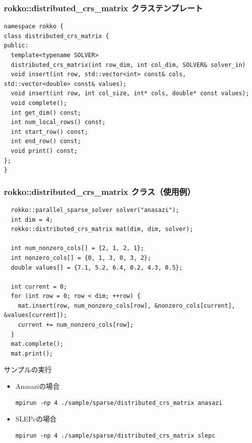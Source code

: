 \begin{frame}[c,fragile]
  \frametitle{rokko::distributed\_crs\_matrix クラステンプレート}
\begin{lstlisting}
namespace rokko {
class distributed_crs_matrix {
public:
  template<typename SOLVER>
  distributed_crs_matrix(int row_dim, int col_dim, SOLVER& solver_in)
  void insert(int row, std::vector<int> const& cols, std::vector<double> const& values);
  void insert(int row, int col_size, int* cols, double* const values);
  void complete();
  int get_dim() const;
  int num_local_rows() const;
  int start_row() const;
  int end_row() const;
  void print() const;
};
}
\end{lstlisting}
\end{frame}


\begin{frame}[c,fragile]
  \frametitle{rokko::distributed\_crs\_matrix クラス（使用例）
     }
\begin{lstlisting}
  rokko::parallel_sparse_solver solver("anasazi");
  int dim = 4;
  rokko::distributed_crs_matrix mat(dim, dim, solver);

  int num_nonzero_cols[] = {2, 1, 2, 1};
  int nonzero_cols[] = {0, 1, 3, 0, 3, 2};
  double values[] = {7.1, 5.2, 6.4, 0.2, 4.3, 0.5};

  int current = 0;
  for (int row = 0; row < dim; ++row) {
    mat.insert(row, num_nonzero_cols[row], &nonzero_cols[current], &values[current]);
    current += num_nonzero_cols[row]; 
  }
  mat.complete();
  mat.print();
\end{lstlisting}
\noindent
サンプルの実行
  \begin{itemize}
  \item Anasaziの場合
\begin{lstlisting}[style=shstyle]
mpirun -np 4 ./sample/sparse/distributed_crs_matrix anasazi
\end{lstlisting}
  \item SLEPcの場合
\begin{lstlisting}[style=shstyle]
mpirun -np 4 ./sample/sparse/distributed_crs_matrix slepc
\end{lstlisting}
  \end{itemize}
\end{frame}


